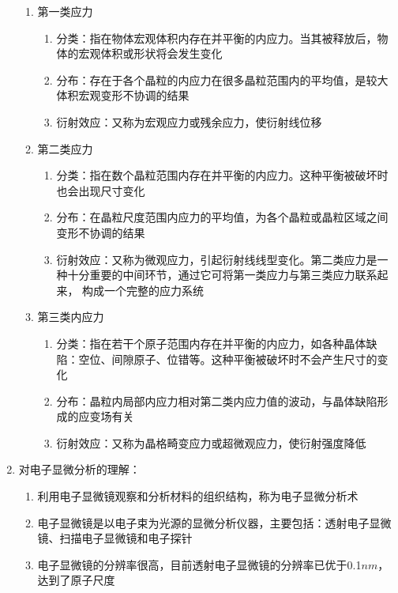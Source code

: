 \documentclass[12pt,a4paper]{article}
\begin{document}
\begin{enumerate}
        \begin{enumerate}
            \item 第一类应力
            \begin{enumerate}
                \item 分类：指在物体宏观体积内存在并平衡的内应力。当其被释放后，物体的宏观体积或形状将会发生变化
                \item 分布：存在于各个晶粒的内应力在很多晶粒范围内的平均值，是较大体积宏观变形不协调的结果
                \item 衍射效应：又称为宏观应力或残余应力，使衍射线位移
            \end{enumerate}
            \item 第二类应力
            \begin{enumerate}
                \item 分类：指在数个晶粒范围内存在并平衡的内应力。这种平衡被破坏时也会出现尺寸变化
                \item 分布：在晶粒尺度范围内应力的平均值，为各个晶粒或晶粒区域之间变形不协调的结果
                \item 衍射效应：又称为微观应力，引起衍射线线型变化。第二类应力是一种十分重要的中间环节，通过它可将第一类应力与第三类应力联系起来，
                构成一个完整的应力系统
            \end{enumerate}
            \item 第三类内应力
            \begin{enumerate}
                \item 分类：指在若干个原子范围内存在并平衡的内应力，如各种晶体缺陷：空位、间隙原子、位错等。这种平衡被破坏时不会产生尺寸的变化
                \item 分布：晶粒内局部内应力相对第二类内应力值的波动，与晶体缺陷形成的应变场有关
                \item 衍射效应：又称为晶格畸变应力或超微观应力，使衍射强度降低
            \end{enumerate}
        \end{enumerate}
        \item 对电子显微分析的理解：
            \begin{enumerate}
                \item 利用电子显微镜观察和分析材料的组织结构，称为电子显微分析术
                \item 电子显微镜是以电子束为光源的显微分析仪器，主要包括：透射电子显微镜、扫描电子显微镜和电子探针
                \item 电子显微镜的分辨率很高，目前透射电子显微镜的分辨率已优于0.1$nm$，达到了原子尺度

\end{enumerate}
\end{enumerate}
\end{document}
